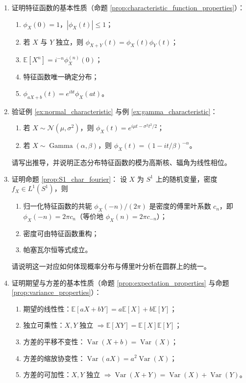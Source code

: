 \begin{enumerate}[leftmargin=3em, label=\textbf{题 \arabic*}]
    \item 证明特征函数的基本性质（命题 \ref{prop:characteristic_function_properties}）：
    \begin{enumerate}[label=(\roman*)]
        \item $\phi_X(0)=1$，$|\phi_X(t)|\le1$；
        \item 若 $X$ 与 $Y$ 独立，则 $\phi_{X+Y}(t)=\phi_X(t)\phi_Y(t)$；
        \item $\mathbb{E}[X^n]=i^{-n}\phi_X^{(n)}(0)$；
        \item 特征函数唯一确定分布；
        \item $\phi_{aX+b}(t)=e^{ibt}\phi_X(at)$。
    \end{enumerate}

    \item 验证例 \ref{ex:normal_characteristic} 与例 \ref{ex:gamma_characteristic}：
    \begin{enumerate}[label=(\roman*)]
        \item 若 $X\sim\mathcal{N}(\mu,\sigma^2)$，则 $\phi_X(t)=e^{i\mu t-\sigma^2t^2/2}$；
        \item 若 $X\sim\operatorname{Gamma}(\alpha,\beta)$，则 $\phi_X(t)=(1-it/\beta)^{-\alpha}$。
    \end{enumerate}
    请写出推导，并说明正态分布特征函数的模为高斯核、辐角为线性相位。

    \item 证明命题 \ref{prop:S1_char_fourier}：
    设 $X$ 为 $S^1$ 上的随机变量，密度 $f_X\in L^1(S^1)$，则
    \begin{enumerate}[label=(\roman*)]
        \item 归一化特征函数的共轭 $\phi_X(-n)/(2\pi)$ 是密度的傅里叶系数 $c_n$，即 $\phi_X(-n)=2\pi c_n$（等价地 $\phi_X(n)=2\pi c_{-n}$）；
        \item 密度可由特征函数重构；
        \item 帕塞瓦尔恒等式成立。
    \end{enumerate}
    请说明这一对应如何体现概率分布与傅里叶分析在圆群上的统一。

    \item 证明期望与方差的基本性质（命题 \ref{prop:expectation_properties}
    与命题 \ref{prop:variance_properties}）：
    \begin{enumerate}[label=(\roman*)]
        \item 期望的线性性：$\mathbb{E}[aX+bY]=a\mathbb{E}[X]+b\mathbb{E}[Y]$；
        \item 独立可乘性：$X,Y$ 独立 $\Rightarrow\mathbb{E}[XY]=\mathbb{E}[X]\mathbb{E}[Y]$；
        \item 方差的平移不变性：$\operatorname{Var}(X+b)=\operatorname{Var}(X)$；
        \item 方差的缩放协变性：$\operatorname{Var}(aX)=a^2\operatorname{Var}(X)$；
        \item 方差的可加性：$X,Y$ 独立 $\Rightarrow\operatorname{Var}(X+Y)=\operatorname{Var}(X)+\operatorname{Var}(Y)$。
    \end{enumerate}


\end{enumerate}
